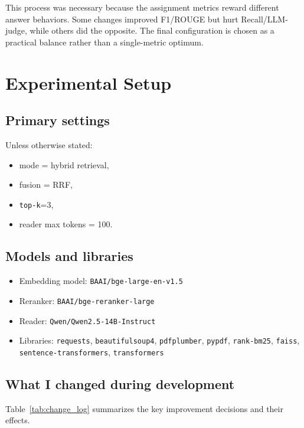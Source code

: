 \documentclass[11pt,twocolumn]{article}
\begin{document}
This process was necessary because the assignment metrics reward different answer behaviors. Some changes improved F1/ROUGE but hurt Recall/LLM-judge, while others did the opposite. The final configuration is chosen as a practical balance rather than a single-metric optimum.

\section{Experimental Setup}
\subsection{Primary settings}
Unless otherwise stated:
\begin{itemize}
    \item mode = hybrid retrieval,
    \item fusion = RRF,
    \item \texttt{top-k}=3,
    \item reader max tokens = 100.
\end{itemize}

\subsection{Models and libraries}
\begin{itemize}
    \item Embedding model: \texttt{BAAI/bge-large-en-v1.5}
    \item Reranker: \texttt{BAAI/bge-reranker-large}
    \item Reader: \texttt{Qwen/Qwen2.5-14B-Instruct}
    \item Libraries: \texttt{requests}, \texttt{beautifulsoup4}, \texttt{pdfplumber}, \texttt{pypdf}, \texttt{rank-bm25}, \texttt{faiss}, \texttt{sentence-transformers}, \texttt{transformers}
\end{itemize}

\subsection{What I changed during development}
Table~\ref{tab:change_log} summarizes the key improvement decisions and their effects.
\end{document}
